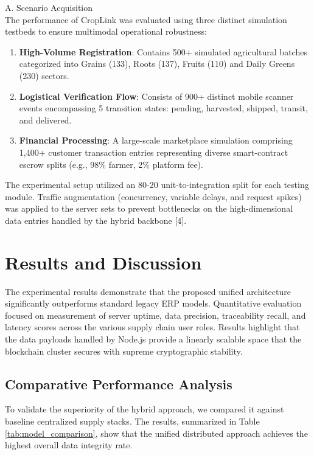 \documentclass[conference]{IEEEtran}
\begin{document}
A. Scenario Acquisition\\
The performance of CropLink was evaluated using three distinct simulation testbeds to ensure multimodal operational robustness:
\begin{enumerate}
    \item \textbf{High-Volume Registration}: Contains 500+ simulated agricultural batches categorized into Grains (133), Roots (137), Fruits (110) and Daily Greens (230) sectors.
    \item \textbf{Logistical Verification Flow}: Consists of 900+ distinct mobile scanner events encompassing 5 transition states: pending, harvested, shipped, transit, and delivered.
    \item \textbf{Financial Processing}: A large-scale marketplace simulation comprising 1,400+ customer transaction entries representing diverse smart-contract escrow splits (e.g., 98\% farmer, 2\% platform fee).
\end{enumerate}
The experimental setup utilized an 80-20 unit-to-integration split for each testing module. Traffic augmentation (concurrency, variable delays, and request spikes) was applied to the server sets to prevent bottlenecks on the high-dimensional data entries handled by the hybrid backbone [4].
\vspace{-0.5em}

\section{Results and Discussion}
The experimental results demonstrate that the proposed unified architecture significantly outperforms standard legacy ERP models. Quantitative evaluation focused on measurement of server uptime, data precision, traceability recall, and latency scores across the various supply chain user roles. Results highlight that the data payloads handled by Node.js provide a linearly scalable space that the blockchain cluster secures with supreme cryptographic stability.

\subsection{Comparative Performance Analysis}
To validate the superiority of the hybrid approach, we compared it against baseline centralized supply stacks. The results, summarized in Table \ref{tab:model_comparison}, show that the unified distributed approach achieves the highest overall data integrity rate.
\end{document}
